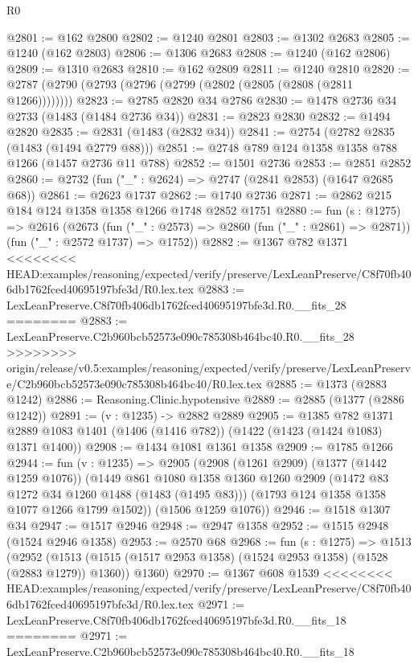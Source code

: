 \begin{lexlean}{R0}
\begin{coremodule}
{{{{{{{{{{{{{{{{{{{{{{{{{{{{{{{{{{{{{{{{{{{{{{{{{{{{{{{{{{{{{{{{{{{{{{{{{{{{{{{{{{{{{{@2801 := @162 @2800
@2802 := @1240 @2801
@2803 := @1302 @2683
@2805 := @1240 (@162 @2803)
@2806 := @1306 @2683
@2808 := @1240 (@162 @2806)
@2809 := @1310 @2683
@2810 := @162 @2809
@2811 := @1240 @2810
@2820 := @2787 (@2790 (@2793 (@2796 (@2799 (@2802 (@2805 (@2808 (@2811 @1266))))))))
@2823 := @2785 @2820 @34 @2786
@2830 := @1478 @2736 @34 @2733 (@1483 (@1484 @2736 @34))
@2831 := @2823 @2830
@2832 := @1494 @2820
@2835 := @2831 (@1483 (@2832 @34))
@2841 := @2754 (@2782 @2835 (@1483 (@1494 @2779 @88)))
@2851 := @2748 @789 @124 @1358 @1358 @788 @1266 (@1457 @2736 @11 @788)
@2852 := @1501 @2736
@2853 := @2851 @2852
@2860 := @2732 (fun ("_" : @2624) => @2747 (@2841 @2853) (@1647 @2685 @68))
@2861 := @2623 @1737
@2862 := @1740 @2736
@2871 := @2862 @215 @184 @124 @1358 @1358 @1266 @1748 @2852 @1751
@2880 := fun (s : @1275) =>
  @2616
    (@2673
      (fun ("_" : @2573) => @2860 (fun ("_" : @2861) => @2871))
      (fun ("_" : @2572 @1737) => @1752))
@2882 := @1367 @782 @1371
<<<<<<<< HEAD:examples/reasoning/expected/verify/preserve/LexLeanPreserve/C8f70fb406db1762fced40695197bfe3d/R0.lex.tex
@2883 := LexLeanPreserve.C8f70fb406db1762fced40695197bfe3d.R0.__fits_28
========
@2883 := LexLeanPreserve.C2b960bcb52573e090c785308b464bc40.R0.__fits_28
>>>>>>>> origin/release/v0.5:examples/reasoning/expected/verify/preserve/LexLeanPreserve/C2b960bcb52573e090c785308b464bc40/R0.lex.tex
@2885 := @1373 (@2883 @1242)
@2886 := Reasoning.Clinic.hypotensive
@2889 := @2885 (@1377 (@2886 @1242))
@2891 := (v : @1235) -> @2882 @2889
@2905 := @1385
    @782
    @1371
    @2889
    @1083
    @1401
    (@1406 (@1416 @782))
    (@1422 (@1423 (@1424 @1083) @1371 @1400))
@2908 := @1434 @1081 @1361 @1358
@2909 := @1785 @1266
@2944 := fun (v : @1235) =>
  @2905
    (@2908
      (@1261 @2909)
      (@1377 (@1442 @1259 @1076))
      (@1449
        @861
        @1080
        @1358
        @1360
        @1260
        @2909
        (@1472 @83 @1272 @34 @1260 @1488 (@1483 (@1495 @83)))
        (@1793 @124 @1358 @1358 @1077 @1266 @1799 @1502))
      (@1506 @1259 @1076))
@2946 := @1518 @1307 @34
@2947 := @1517 @2946
@2948 := @2947 @1358
@2952 := @1515 @2948 (@1524 @2946 @1358)
@2953 := @2570 @68
@2968 := fun (s : @1275) =>
  @1513
    (@2952
      (@1513 (@1515 (@1517 @2953 @1358) (@1524 @2953 @1358) (@1528 (@2883 @1279)) @1360))
      @1360)
@2970 := @1367 @608 @1539
<<<<<<<< HEAD:examples/reasoning/expected/verify/preserve/LexLeanPreserve/C8f70fb406db1762fced40695197bfe3d/R0.lex.tex
@2971 := LexLeanPreserve.C8f70fb406db1762fced40695197bfe3d.R0.__fits_18
========
@2971 := LexLeanPreserve.C2b960bcb52573e090c785308b464bc40.R0.__fits_18
}}}}}}}}}}}}}}}}}}}}}}}}}}}}}}}}}}}}}}}}}}}}}}}}}}}}}}}}}}}}}}}}}}}}}}}}}}}}}}}}}}}}}}
\end{coremodule}
\end{lexlean}
